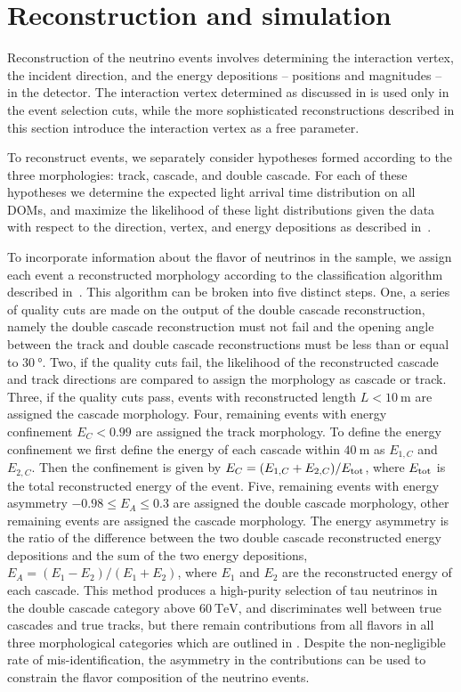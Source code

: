 \section{Reconstruction and simulation}

Reconstruction of the neutrino events involves determining the interaction vertex, the incident direction, and the energy depositions -- positions and magnitudes -- in the detector.
The interaction vertex determined as discussed in  is used only in the event selection cuts, while the more sophisticated reconstructions described in this section introduce the interaction vertex as a free parameter.

To reconstruct events, we separately consider hypotheses formed according to the three morphologies: track, cascade, and double cascade.
For each of these hypotheses we determine the expected light arrival time distribution on all DOMs, and maximize the likelihood of these light distributions given the data with respect to the direction, vertex, and energy depositions as described in~\cite{Aartsen:2013vja}.

To incorporate information about the flavor of neutrinos in the sample, we assign each event a reconstructed morphology according to the classification algorithm described in~\cite{Usner2018Search}.
This algorithm can be broken into five distinct steps.
One, a series of quality cuts are made on the output of the double cascade reconstruction, namely the double cascade reconstruction must not fail and the opening angle between the track and double cascade reconstructions must be less than or equal to $\SI{30}\degree$.
Two, if the quality cuts fail, the likelihood of the reconstructed cascade and track directions are compared to assign the morphology as cascade or track.
Three, if the quality cuts pass, events with reconstructed length $L < \SI{10}\meter$ are assigned the cascade morphology.
Four, remaining events with energy confinement $E_C < 0.99$ are assigned the track morphology.
To define the energy confinement we first define the energy of each cascade within $\SI{40}\meter$ as $E_{1,C}$ and $E_{2,C}$.
Then the confinement is given by $E_C = (E_{1,C} + E_{2,C}) / E_{\textmd{tot}}$, where $E_\textmd{tot}$ is the total reconstructed energy of the event.
Five, remaining events with energy asymmetry $-0.98 \leq E_A \leq 0.3$ are assigned the double cascade morphology, other remaining events are assigned the cascade morphology.
The energy asymmetry is the ratio of the difference between the two double cascade reconstructed energy depositions and the sum of the two energy depositions, $E_A = (E_1 - E_2)/(E_1 + E_2)$, where $E_1$ and $E_2$ are the reconstructed energy of each cascade.
This method produces a high-purity selection of tau neutrinos in the double cascade category above $\SI{60}\TeV$, and discriminates well between true cascades and true tracks, but there remain contributions from all flavors in all three morphological categories which are outlined in .
Despite the non-negligible rate of mis-identification, the asymmetry in the contributions can be used to constrain the flavor composition of the neutrino events.

